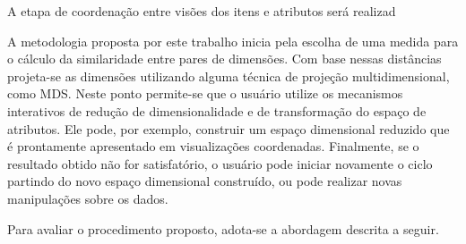 A etapa de coordenação entre visões dos itens e atributos será realizad



A metodologia proposta por este trabalho inicia pela escolha de uma medida para o cálculo da similaridade entre pares de dimensões. Com base nessas distâncias projeta-se as dimensões utilizando alguma técnica de projeção multidimensional, como MDS. Neste ponto permite-se que o usuário utilize os mecanismos interativos de redução de dimensionalidade e de transformação do espaço de atributos. Ele pode, por exemplo, construir um espaço dimensional reduzido que é prontamente apresentado em visualizações coordenadas. Finalmente, se o resultado obtido não for satisfatório, o usuário pode iniciar novamente o ciclo partindo do novo espaço dimensional construído, ou pode realizar novas manipulações sobre os dados.

Para avaliar o procedimento proposto, adota-se a abordagem descrita a seguir.





